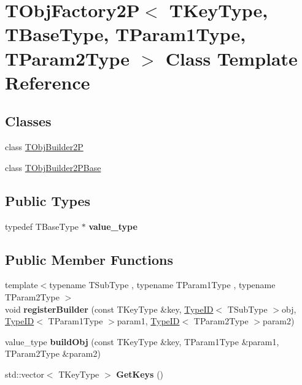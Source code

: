 \hypertarget{class_t_obj_factory2_p}{\section{T\+Obj\+Factory2\+P$<$ T\+Key\+Type, T\+Base\+Type, T\+Param1\+Type, T\+Param2\+Type $>$ Class Template Reference}
\label{class_t_obj_factory2_p}
}
\subsection*{Classes}
\begin{DoxyCompactItemize}
\item 
class \hyperlink{class_t_obj_factory2_p_1_1_t_obj_builder2_p}{T\+Obj\+Builder2\+P}
\item 
class \hyperlink{class_t_obj_factory2_p_1_1_t_obj_builder2_p_base}{T\+Obj\+Builder2\+P\+Base}
\end{DoxyCompactItemize}
\subsection*{Public Types}
\begin{DoxyCompactItemize}
\item 
\hypertarget{class_t_obj_factory2_p_a56469f5b7e6cd28e425e20f6b2626013}{typedef T\+Base\+Type $\ast$ {\bfseries value\+\_\+type}}\label{class_t_obj_factory2_p_a56469f5b7e6cd28e425e20f6b2626013}

\end{DoxyCompactItemize}
\subsection*{Public Member Functions}
\begin{DoxyCompactItemize}
\item 
\hypertarget{class_t_obj_factory2_p_aec79de92c7524127f74e70607f208b03}{{\footnotesize template$<$typename T\+Sub\+Type , typename T\+Param1\+Type , typename T\+Param2\+Type $>$ }\\void {\bfseries register\+Builder} (const T\+Key\+Type \&key, \hyperlink{class_type_i_d}{Type\+I\+D}$<$ T\+Sub\+Type $>$obj, \hyperlink{class_type_i_d}{Type\+I\+D}$<$ T\+Param1\+Type $>$param1, \hyperlink{class_type_i_d}{Type\+I\+D}$<$ T\+Param2\+Type $>$param2)}\label{class_t_obj_factory2_p_aec79de92c7524127f74e70607f208b03}

\item 
\hypertarget{class_t_obj_factory2_p_a9a7d7b82eae7358266d5d6922c3c8e10}{value\+\_\+type {\bfseries build\+Obj} (const T\+Key\+Type \&key, T\+Param1\+Type \&param1, T\+Param2\+Type \&param2)}\label{class_t_obj_factory2_p_a9a7d7b82eae7358266d5d6922c3c8e10}

\item 
\hypertarget{class_t_obj_factory2_p_a2004fa750eb1f7dd17b33e9c3c92302a}{std\+::vector$<$ T\+Key\+Type $>$ {\bfseries Get\+Keys} ()}\label{class_t_obj_factory2_p_a2004fa750eb1f7dd17b33e9c3c92302a}

\end{DoxyCompactItemize}
